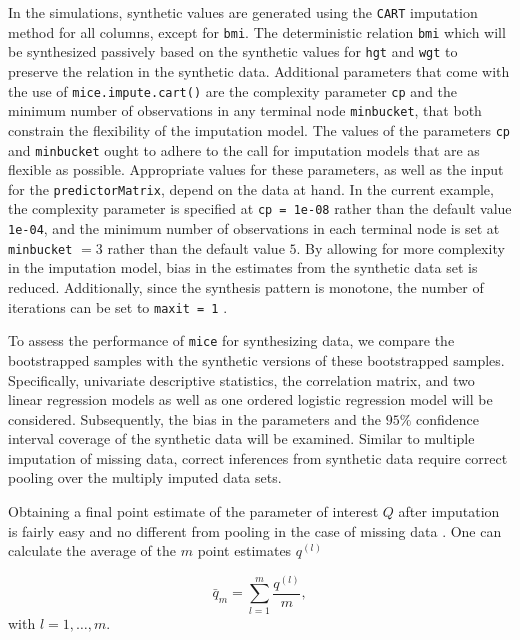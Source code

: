 \documentclass[psych,article,submit,moreauthors,pdftex]{mdpi}
\begin{document}
In the simulations, synthetic values are generated using the
\texttt{CART} imputation method for all columns, except for
\texttt{bmi}. The deterministic relation \texttt{bmi} which will be
synthesized passively based on the synthetic values for \texttt{hgt} and
\texttt{wgt} to preserve the relation in the synthetic data. Additional
parameters that come with the use of \texttt{mice.impute.cart()} are the
complexity parameter \texttt{cp} and the minimum number of observations
in any terminal node \texttt{minbucket}, that both constrain the
flexibility of the imputation model. The values of the parameters
\texttt{cp} and \texttt{minbucket} ought to adhere to the call for
imputation models that are as flexible as possible. Appropriate values
for these parameters, as well as the input for the
\texttt{predictorMatrix}, depend on the data at hand. In the current
example, the complexity parameter is specified at \texttt{cp\ =\ 1e-08}
rather than the default value \texttt{1e-04}, and the minimum number of
observations in each terminal node is set at \texttt{minbucket} \(= 3\)
rather than the default value \(5\). By allowing for more complexity in
the imputation model, bias in the estimates from the synthetic data set
is reduced. Additionally, since the synthesis pattern is monotone, the
number of iterations can be set to \texttt{maxit\ =\ 1}
\citep[e.g.,][Ch. 3]{drechsler_synthetic_2011}.

To assess the performance of \texttt{mice} for synthesizing data, we
compare the bootstrapped samples with the synthetic versions of these
bootstrapped samples. Specifically, univariate descriptive statistics,
the correlation matrix, and two linear regression models as well as one
ordered logistic regression model will be considered. Subsequently, the
bias in the parameters and the \(95\%\) confidence interval coverage of
the synthetic data will be examined. Similar to multiple imputation of
missing data, correct inferences from synthetic data require correct
pooling over the multiply imputed data sets.

Obtaining a final point estimate of the parameter of interest \(Q\)
after imputation is fairly easy and no different from pooling in the
case of missing data \citep{rubin_multiple_1987}. One can calculate the
average of the \(m\) point estimates \(q^{(l)}\)

\[
\bar{q}_m = \sum_{l = 1}^m \frac{q^{(l)}}{m},
\] with \(l = 1, \dots, m\).
\end{document}
